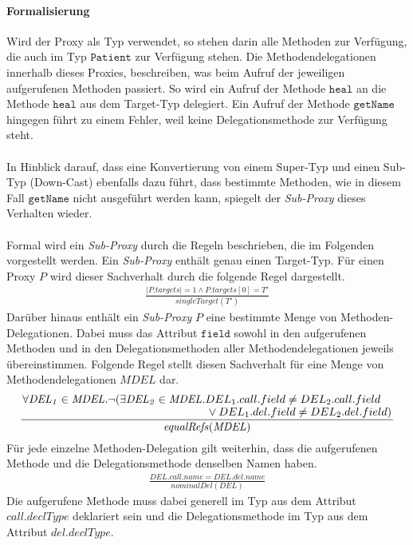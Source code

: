 \documentclass[a4paper,12pt]{article}
\begin{document}
\paragraph{Formalisierung}
Wird der Proxy als Typ verwendet, so stehen darin alle Methoden zur Verfügung, die auch im Typ $\texttt{Patient}$ zur Verfügung stehen. Die Methodendelegationen innerhalb dieses Proxies, beschreiben, was beim Aufruf der jeweiligen aufgerufenen Methoden passiert. So wird ein Aufruf der Methode $\texttt{heal}$ an die Methode $\texttt{heal}$ aus dem Target-Typ delegiert. Ein Aufruf der Methode $\texttt{getName}$ hingegen führt zu einem Fehler, weil keine Delegationsmethode zur Verfügung steht.\\\\
In Hinblick darauf, dass eine Konvertierung von einem Super-Typ und einen Sub-Typ (Down-Cast) ebenfalls dazu führt, dass bestimmte Methoden, wie in diesem Fall $\texttt{getName}$ nicht ausgeführt werden kann, spiegelt der \emph{Sub-Proxy} dieses Verhalten wieder.\\\\
Formal wird ein \emph{Sub-Proxy} durch die Regeln beschrieben, die im Folgenden vorgestellt werden.
Ein \emph{Sub-Proxy} enthält genau einen Target-Typ. Für einen Proxy $P$ wird dieser Sachverhalt durch die folgende Regel dargestellt.
\begin{gather*}
\frac{|P.targets| = 1 \wedge P.targets[0] = T'}{\mathit{singleTarget(T')}}
\end{gather*}
Darüber hinaus enthält ein \emph{Sub-Proxy} $P$ eine bestimmte Menge von Methoden-Delegationen. Dabei muss das Attribut $\texttt{field}$ sowohl in den aufgerufenen Methoden und in den Delegationsmethoden aller Methodendelegationen jeweils übereinstimmen. Folgende Regel stellt diesen Sachverhalt für eine Menge von Methodendelegationen $\mathit{MDEL}$ dar.
\begin{gather*}
\frac{\splitfrac{\forall \mathit{DEL_1}\in \mathit{MDEL}. \neg(\exists \mathit{DEL_2} \in \mathit{MDEL}.DEL_1.call.field \neq DEL_2.call.field}{ \vee DEL_1.del.field \neq DEL_2.del.field )}}
{\mathit{equalRefs(MDEL)}}
\end{gather*}
Für jede einzelne Methoden-Delegation gilt weiterhin, dass die aufgerufenen Methode und die Delegationsmethode denselben Namen haben.
\begin{gather*}
\frac{\mathit{DEL.call.name} = \mathit{DEL.del.name}}
{\mathit{nominalDel(DEL)}}
\end{gather*}
Die aufgerufene Methode muss dabei generell im Typ aus dem Attribut $call.declType$ deklariert sein und die Delegationsmethode im Typ aus dem Attribut $del.declType$.
\end{document}
